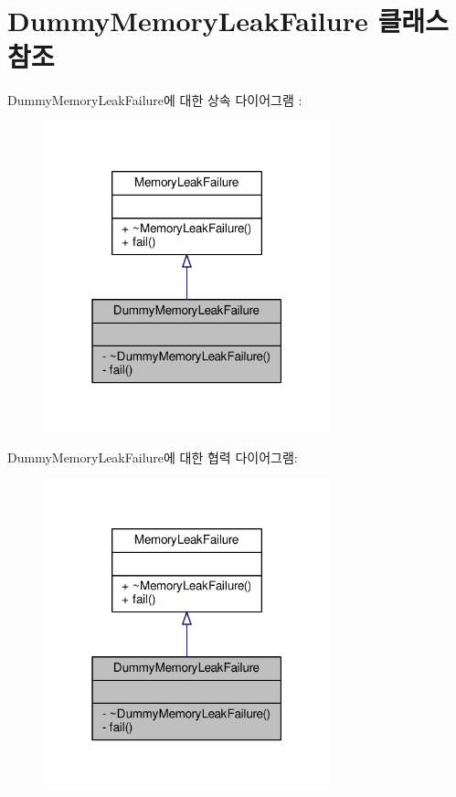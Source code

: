 \hypertarget{class_dummy_memory_leak_failure}{}\section{Dummy\+Memory\+Leak\+Failure 클래스 참조}
\label{class_dummy_memory_leak_failure}


Dummy\+Memory\+Leak\+Failure에 대한 상속 다이어그램 \+: 
\nopagebreak
\begin{figure}[H]
\begin{center}
\leavevmode
\includegraphics[width=235pt]{class_dummy_memory_leak_failure__inherit__graph}
\end{center}
\end{figure}


Dummy\+Memory\+Leak\+Failure에 대한 협력 다이어그램\+:
\nopagebreak
\begin{figure}[H]
\begin{center}
\leavevmode
\includegraphics[width=235pt]{class_dummy_memory_leak_failure__coll__graph}
\end{center}
\end{figure}
